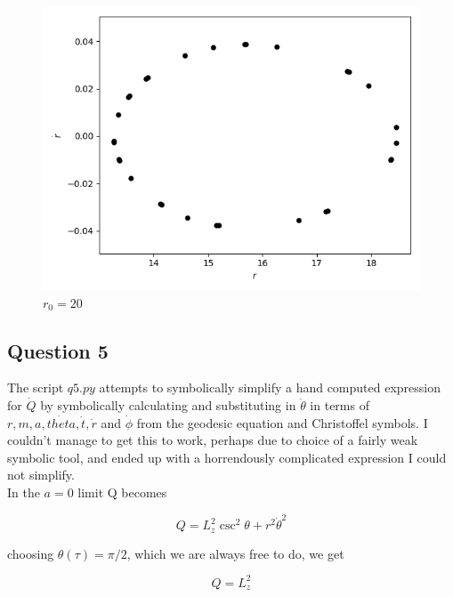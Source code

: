 \documentclass[10pt,a4paper]{report}
\begin{document}
\begin{figure}[!ht]
\begin{minipage}[b]{0.5\linewidth}
\centering
\includegraphics[width=\textwidth]{4/r0=12.png}
\caption{$r_0=20$}
\label{fig:figure1}
\end{minipage}
\end{figure}




\subsection*{Question 5}
The script $q5.py$ attempts to symbolically simplify a hand computed expression for $\dot{Q}$ by symbolically calculating and substituting in $\ddot{\theta}$ in terms of $r,m,a,\dot{theta}, \dot{t}, \dot{r}$ and $\dot{\phi}$ from the geodesic equation and Christoffel symbols. I couldn't manage to get this to work, perhaps due to choice of a fairly weak symbolic tool, and ended up with a horrendously complicated expression I could not simplify.\\

In the $a=0$ limit Q becomes

\begin{equation*}
Q = L_z^2\csc^2{\theta} + r^2\dot{\theta}^2
\end{equation*}

choosing $\theta(\tau) = \pi/2$, which we are always free to do, we get 

\begin{equation*}
Q = L_z^2
\end{equation*}
\end{document}
